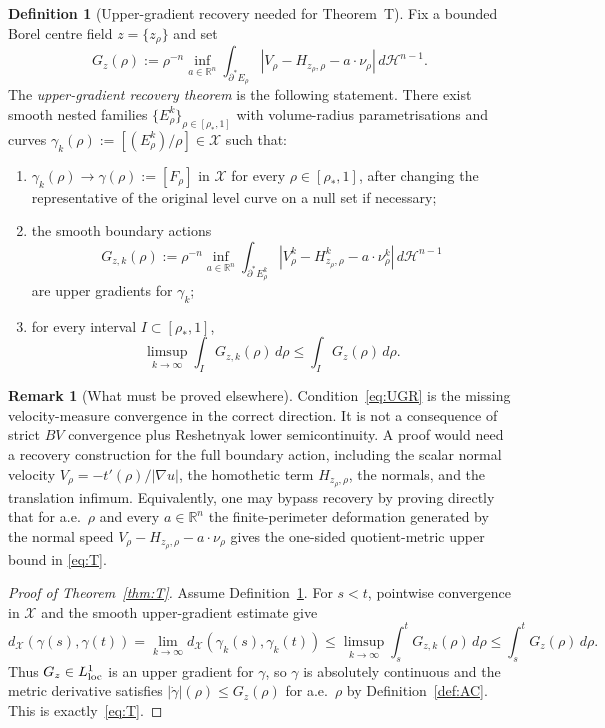 \documentclass[11pt]{article}
\theoremstyle{definition}
\newtheorem{definition}[theorem]{Definition}
\newtheorem{remark}[theorem]{Remark}
\newcommand{\R}{\mathbb{R}}
\newcommand{\rstar}{\rho_{*}}
\newcommand{\X}{\mathcal X}
\begin{document}
\begin{definition}[Upper-gradient recovery needed for Theorem~T]\label{def:UGR}
Fix a bounded Borel centre field $z=\{z_\rho\}$ and set
\begin{equation}\label{eq:G-target}
   G_z(\rho):=\rho^{-n}\inf_{a\in\R^n}
       \int_{\partial^*E_\rho}
       |V_\rho-H_{z_\rho,\rho}-a\cdot\nu_\rho|\,d\mathcal H^{n-1}.
\end{equation}
The \emph{upper-gradient recovery theorem} is the following statement.
There exist smooth nested families $\{E_\rho^k\}_{\rho\in[\rstar,1]}$ with
volume-radius parametrisations and curves
$\gamma_k(\rho):=[(E_\rho^k)/\rho]\in\X$ such that:
\begin{enumerate}
\item $\gamma_k(\rho)\to\gamma(\rho):=[F_\rho]$ in $\X$ for every
      $\rho\in[\rstar,1]$, after changing the representative of the original
      level curve on a null set if necessary;
\item the smooth boundary actions
\[
   G_{z,k}(\rho):=\rho^{-n}\inf_{a\in\R^n}
       \int_{\partial^*E_\rho^k}
       |V_\rho^k-H^k_{z_\rho,\rho}-a\cdot\nu_\rho^k|\,
       d\mathcal H^{n-1}
\]
      are upper gradients for $\gamma_k$;
\item for every interval $I\subset[\rstar,1]$,
\begin{equation}\label{eq:UGR}
   \limsup_{k\to\infty}\int_I G_{z,k}(\rho)\,d\rho
   \le
   \int_I G_z(\rho)\,d\rho .
\end{equation}
\end{enumerate}
\end{definition}

\begin{remark}[What must be proved elsewhere]
Condition~\eqref{eq:UGR} is the missing velocity-measure convergence in the
correct direction.  It is not a consequence of strict $BV$ convergence plus
Reshetnyak lower semicontinuity.  A proof would need a recovery construction
for the full boundary action, including the scalar normal velocity
$V_\rho=-t'(\rho)/|\nabla u|$, the homothetic term
$H_{z_\rho,\rho}$, the normals, and the translation infimum.  Equivalently,
one may bypass recovery by proving directly that for a.e.\ $\rho$ and every
$a\in\R^n$ the finite-perimeter deformation generated by the normal speed
$V_\rho-H_{z_\rho,\rho}-a\cdot\nu_\rho$ gives the one-sided quotient-metric
upper bound in \eqref{eq:T}.
\end{remark}

\begin{proof}[Proof of Theorem~\ref{thm:T}]
Assume Definition~\ref{def:UGR}.  For $s<t$, pointwise convergence in $\X$
and the smooth upper-gradient estimate give
\[
   d_\X(\gamma(s),\gamma(t))
   =\lim_{k\to\infty}d_\X(\gamma_k(s),\gamma_k(t))
   \le \limsup_{k\to\infty}\int_s^t G_{z,k}(\rho)\,d\rho
   \le \int_s^t G_z(\rho)\,d\rho .
\]
Thus $G_z\in L^1_{\rm loc}$ is an upper gradient for $\gamma$, so $\gamma$ is
absolutely continuous and the metric derivative satisfies
$|\dot\gamma|(\rho)\le G_z(\rho)$ for a.e.\ $\rho$ by
Definition~\ref{def:AC}.  This is exactly~\eqref{eq:T}.
\end{proof}
\end{document}
